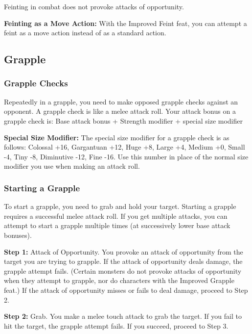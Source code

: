 Feinting in combat does not provoke attacks of opportunity.

\textbf{Feinting as a Move Action:} With the Improved Feint feat, you can attempt 
a feint as a move action instead of as a standard action.

\subsection{Grapple}

\subsubsection{Grapple Checks}

Repeatedly in a grapple, you need to make opposed grapple checks against an opponent. 
A grapple check is like a melee attack roll. Your attack bonus on a grapple check 
is: Base attack bonus + Strength modifier + special size modifier

\textbf{Special Size Modifier:} The special size modifier for a grapple check is 
as follows: Colossal +16, Gargantuan +12, Huge +8, Large +4, Medium +0, Small -4, 
Tiny -8, Diminutive -12, Fine -16. Use this number in place of the normal size 
modifier you use when making an attack roll.

\subsubsection{Starting a Grapple}

To start a grapple, you need to grab and hold your target. Starting a grapple requires 
a successful melee attack roll. If you get multiple attacks, you can attempt to 
start a grapple multiple times (at successively lower base attack bonuses).

\textbf{Step 1:} Attack of Opportunity. You provoke an attack of opportunity from 
the target you are trying to grapple. If the attack of opportunity deals damage, 
the grapple attempt fails. (Certain monsters do not provoke attacks of opportunity 
when they attempt to grapple, nor do characters with the Improved Grapple feat.) 
If the attack of opportunity misses or fails to deal damage, proceed to Step 2.

\textbf{Step 2:} Grab. You make a melee touch attack to grab the target. If you 
fail to hit the target, the grapple attempt fails. If you succeed, proceed to Step 3.

